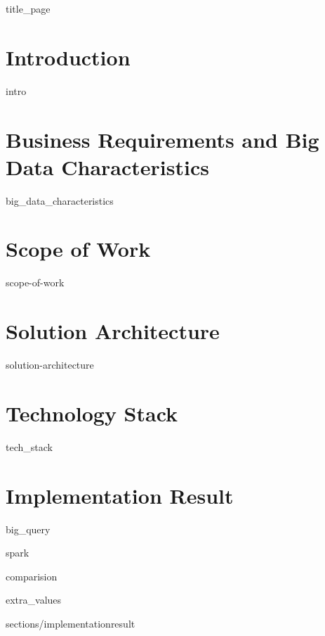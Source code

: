 \documentclass[a4paper, 12pt]{article}
\begin{document}
{title_page}

\newpage
\tableofcontents
\newpage

\section{Introduction}
{intro}
\newpage

\section{Business Requirements and Big Data Characteristics}
{big_data_characteristics}
\newpage

\section{Scope of Work}
{scope-of-work}
\newpage

\section{Solution Architecture}
{solution-architecture}
\newpage

\section{Technology Stack}
{tech_stack}
\newpage

\section{Implementation Result}

{big_query}

{spark}

{comparision}

{extra_values}
\newpage

 {sections/implementation}{result}
\newpage

\printbibliography

\printindex
\end{document}
